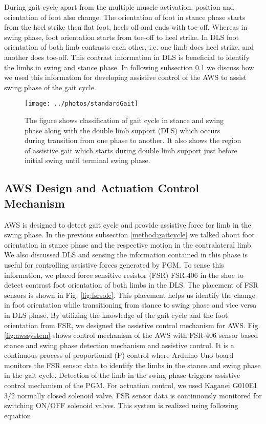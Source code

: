 \documentclass[letterpaper, 10 pt, conference]{ieeeconf}  %
\begin{document}
During gait cycle apart from the multiple muscle activation, position and orientation of foot also change. The orientation of foot in stance phase starts from the heel strike then flat foot, heels off and ends with toe-off. Whereas in swing phase, foot orientation starts from toe-off to heel strike. In DLS foot orientation of both limb contrasts each other, i.e. one limb does heel strike, and another does toe-off. This contrast information in DLS is beneficial to identify the limbs in swing and stance phase. In following subsection \ref{method:awscontrol} we discuss how we used this information for developing assistive control of the AWS to assist swing phase of the gait cycle.


\begin{figure}
	\centering
	\texttt{[image: ../photos/standardGait]}
	\caption{The figure shows classification of gait cycle in stance and swing phase along with the double limb support (DLS) which occurs during transition from one phase to another. It also shows the region of assistive gait which starts during double limb support just before initial swing until terminal swing phase.}
	\label{fig:standardgait}
\end{figure}

\subsection{AWS Design and Actuation Control Mechanism} \label{method:awscontrol}

AWS is designed to detect gait cycle and provide assistive force for limb in the swing phase. In the previous subsection \ref{method:gaitcycle} we talked about foot orientation in stance phase and the respective motion in the contralateral limb. We also discussed DLS and sensing the information contained in this phase is useful for controlling assistive forces generated by PGM. To sense this information, we placed force sensitive resistor (FSR) FSR-406 in the shoe to detect contrast foot orientation of both limbs in the DLS. The placement of FSR sensors is shown in Fig. \ref{fig:fsrsole}. This placement helps us identify the change in foot orientation while transitioning from stance to swing phase and vice versa in DLS phase. By utilizing the knowledge of the gait cycle and the foot orientation from FSR, we designed the assistive control mechanism for AWS. Fig. \ref{fig:awssystem} shows control mechanism of the AWS with FSR-406 sensor based stance and swing phase detection mechanism and assistive control. It is a continuous process of proportional (P) control where Arduino Uno board monitors the FSR sensor data to identify the limbs in the stance and swing phase in the gait cycle. Detection of the limb in the swing phase triggers assistive control mechanism of the PGM. For actuation control, we used Kaganei G010E1 3/2 normally closed solenoid valve. FSR sensor data is continuously monitored for switching ON/OFF solenoid valves. This system is realized using following equation
\end{document}
